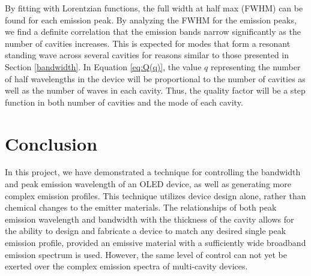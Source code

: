 \documentclass{report}
\begin{document}
        By fitting with Lorentzian functions, the full width at half max (FWHM) can be found for each emission peak. By analyzing the FWHM for the emission peaks, we find a definite correlation that the emission bands narrow significantly as the number of cavities increases. This is expected for modes that form a resonant standing wave across several cavities for reasons similar to those presented in Section \ref{bandwidth}. In Equation \ref{eq:Q(q)}, the value $q$ representing the number of half wavelengths in the device will be proportional to the number of cavities as well as the number of waves in each cavity. Thus, the quality factor will be a step function in both number of cavities and the mode of each cavity.
% 


\chapter{Conclusion} \label{concl}

    In this project, we have demonstrated a technique for controlling the bandwidth and peak emission wavelength of an OLED device, as well as generating more complex emission profiles. This technique utilizes device design alone, rather than chemical changes to the emitter materials. The relationships of both peak emission wavelength and bandwidth with the thickness of the cavity allows for the ability to design and fabricate a device to match any desired single peak emission profile, provided  an emissive material with a sufficiently wide broadband emission spectrum is used. However, the same level of control can not yet be exerted over the complex emission spectra of multi-cavity devices.
    
\end{document}
